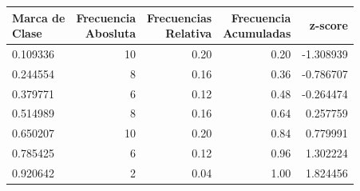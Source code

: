 \documentclass[12pt,a4paper]{article}
\begin{document}
{{            \begin{center}
                \begin{tabular}{lrrrr}
                \toprule
                    \makecell{Marca de\\Clase} & \makecell{Frecuencia\\Abosluta} & \makecell{Frecuencias\\Relativa} & \makecell{Frecuencia\\Acumuladas} & z-score \\
                \midrule
                    0.109336 & 10 & 0.20 & 0.20 & -1.308939 \\
                    0.244554 & 8  & 0.16 & 0.36 & -0.786707 \\
                    0.379771 & 6  & 0.12 & 0.48 & -0.264474 \\
                    0.514989 & 8  & 0.16 & 0.64 &  0.257759 \\
                    0.650207 & 10 & 0.20 & 0.84 &  0.779991 \\
                    0.785425 & 6  & 0.12 & 0.96 &  1.302224 \\
                    0.920642 & 2  & 0.04 & 1.00 &  1.824456 \\
                \bottomrule
                \end{tabular}
            \end{center}

}}
\end{document}
